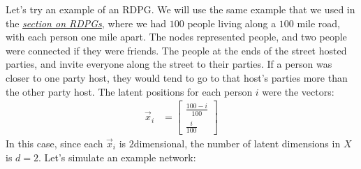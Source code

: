 \documentclass[letterpaper,10pt,english]{jupyterBook}
\begin{document}
\sphinxAtStartPar
Let’s try an example of an  RDPG. We will use the same example that we used in the {\hyperref[\detokenize{representations/ch6/estimating-parameters_spectral:link?}]{\emph{section on RDPGs}}}, where we had \(100\) people living along a \(100\) mile road, with each person one mile apart. The nodes represented people, and two people were connected if they were friends. The people at the ends of the street hosted parties, and invite everyone along the street to their parties. If a person was closer to one party host, they would tend to go to that host’s parties more than the other party host. The latent positions for each person \(i\) were the vectors:
\begin{align*}
    \vec x_i &= \begin{bmatrix}
        \frac{100 - i}{100} \\ \frac{i}{100}
    \end{bmatrix}
\end{align*}
\sphinxAtStartPar
In this case, since each \(\vec x_i\) is \(2\)\sphinxhyphen{}dimensional, the number of latent dimensions in \(X\) is \(d=2\). Let’s simulate an example network:

\begin{sphinxVerbatim}[commandchars=\\\{\}]
   
   

    

  
    
    \PYG{p}{[}\PYG{p}{]}  \PYG{p}{[}   \PYG{p}{]}

    

  
\end{sphinxVerbatim}
\end{document}
